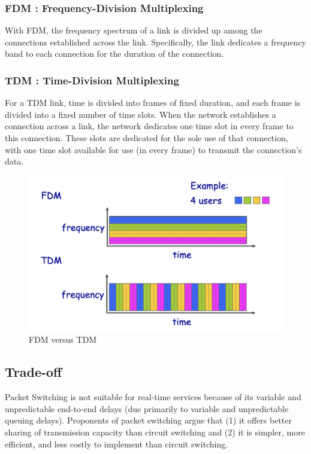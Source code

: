 \documentclass[11pt]{article}
\begin{document}
\subsubsection{FDM : Frequency-Division Multiplexing}
	
	With FDM, the frequency spectrum of a link is divided up among the connections established across the link. Specifically, the link dedicates a frequency band to each connection for the duration of the connection.
	
\subsubsection{TDM : Time-Division Multiplexing}
	
	For a TDM link, time is divided into frames of fixed duration, and each frame is divided into a fixed number of time slots. When the network establishes a connection across a link, the network dedicates one time slot in every frame to this connection. These slots are dedicated for the sole use of that connection, with one time slot available for use (in every frame) to transmit the connection’s data.
	
\begin{figure}[h]
	\centering
	\includegraphics[width=0.8\linewidth]{images/FDMvsTDM.png}
	\caption{FDM versus TDM}
	\label{fig:FDMvsTDM}
\end{figure}

\subsection{Trade-off}

Packet Switching is not suitable for real-time services because of its variable and unpredictable end-to-end delays (due primarily to variable and unpredictable queuing delays). Proponents of packet switching argue that (1) it offers better sharing of transmission capacity than circuit switching and (2) it is simpler, more efficient, and less costly to implement than circuit switching.
\end{document}
